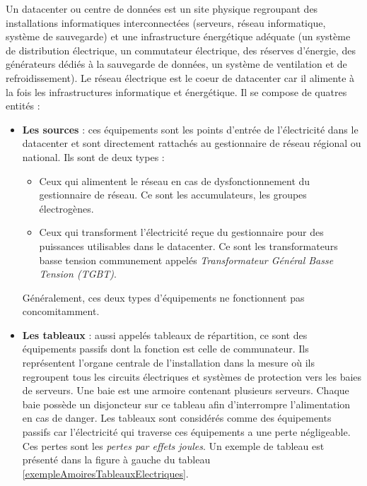 Un datacenter ou centre de donn\'ees est un site physique regroupant des installations informatiques interconnect\'ees (serveurs, r\'eseau informatique, syst\`eme de sauvegarde) et une infrastructure \'energ\'etique ad\'equate (un syst\`eme de distribution \'electrique, un commutateur \'electrique, des r\'eserves d'\'energie, des g\'en\'erateurs d\'edi\'es \`a la sauvegarde de donn\'ees, un syst\`eme de ventilation et de refroidissement).
\newline
Le r\'eseau \'electrique est le coeur de datacenter car il alimente \`a la fois les infrastructures informatique et \'energ\'etique. Il se compose de quatres entit\'es :
\begin{itemize}
\item {\bf Les sources} : 
ces \'equipements sont les points d'entr\'ee de l'\'electricit\'e dans le datacenter et sont directement rattach\'es au gestionnaire de r\'eseau r\'egional ou national. 
Ils sont de deux types : 
\begin{itemize}
\item Ceux qui alimentent le  r\'eseau en cas de dysfonctionnement du gestionnaire de r\'eseau. Ce sont les accumulateurs, les groupes \'electrog\`enes.
\item Ceux qui transforment l'\'electricit\'e re\c cue du gestionnaire pour des puissances utilisables dans le datacenter. Ce sont les transformateurs basse tension communement appel\'es {\em Transformateur G\'en\'eral Basse Tension (TGBT)}. 
\end{itemize}
G\'en\'eralement, ces deux types d'\'equipements ne fonctionnent pas concomitamment.


\item {\bf Les tableaux} :
aussi appel\'es tableaux de r\'epartition, ce sont des \'equipements passifs dont la fonction est celle de communateur. 
Ils repr\'esentent l'organe centrale de l'installation dans la mesure o\`u ils regroupent tous les circuits \'electriques et syst\`emes de protection vers les baies de serveurs. 
Une baie est une armoire contenant plusieurs serveurs.
Chaque baie poss\`ede un disjoncteur sur ce tableau afin d'interrompre l'alimentation en cas de danger. 
Les tableaux sont consid\'er\'es comme des \'equipements passifs car l'\'electricit\'e qui traverse ces \'equipements a une perte n\'egligeable.   Ces pertes sont les {\em pertes par effets joules}. Un exemple de tableau est pr\'esent\'e dans la figure \`a gauche du tableau \ref{exempleAmoiresTableauxElectriques}. 


\end{itemize}
